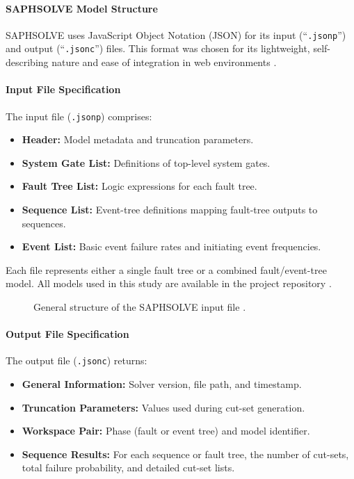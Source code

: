 \paragraph{SAPHSOLVE Model Structure}
SAPHSOLVE uses JavaScript Object Notation (JSON) \cite{37} for its input (``\texttt{.jsonp}'') and output (``\texttt{.jsonc}'') files. This format was chosen for its lightweight, self-describing nature and ease of integration in web environments \cite{15}.

\paragraph{Input File Specification}
The input file (\texttt{.jsonp}) comprises:
\begin{itemize}
  \item \textbf{Header:} Model metadata and truncation parameters.
  \item \textbf{System Gate List:} Definitions of top-level system gates.
  \item \textbf{Fault Tree List:} Logic expressions for each fault tree.
  \item \textbf{Sequence List:} Event-tree definitions mapping fault-tree outputs to sequences.
  \item \textbf{Event List:} Basic event failure rates and initiating event frequencies.
\end{itemize}
Each file represents either a single fault tree or a combined fault/event-tree model. All models used in this study are available in the project repository \cite{38}.

\begin{figure}[htbp]
  \centering
  \caption{General structure of the SAPHSOLVE input file \cite{15}.}
  \label{fig:saphsolve_input}
\end{figure}

\paragraph{Output File Specification}
The output file (\texttt{.jsonc}) returns:
\begin{itemize}
  \item \textbf{General Information:} Solver version, file path, and timestamp.
  \item \textbf{Truncation Parameters:} Values used during cut-set generation.
  \item \textbf{Workspace Pair:} Phase (fault or event tree) and model identifier.
  \item \textbf{Sequence Results:} For each sequence or fault tree, the number of cut-sets, total failure probability, and detailed cut-set lists.
\end{itemize}

